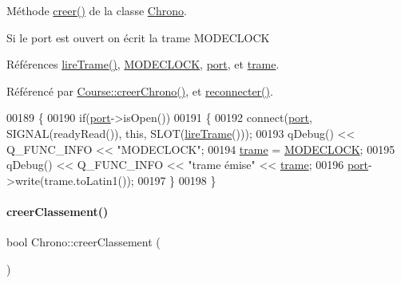 Méthode \hyperlink{class_chrono_a74d85a4e856e2e59afacaa061feb7b75}{creer()} de la classe \hyperlink{class_chrono}{Chrono}. 

Si le port est ouvert on écrit la trame M\+O\+D\+E\+C\+L\+O\+CK 

Références \hyperlink{class_chrono_ae7c3c8494ace02f4c9dd714f6f0e574a}{lire\+Trame()}, \hyperlink{chrono_8h_a51714542fe5fc5c442f126a96c568050}{M\+O\+D\+E\+C\+L\+O\+CK}, \hyperlink{class_chrono_aca5fbe0eebd7f876f954d4a99c564167}{port}, et \hyperlink{class_chrono_a26f2155aa6e5ef4296e5456b64a713b5}{trame}.



Référencé par \hyperlink{class_course_a6eb96222d8dc1f352e28f36e9b414448}{Course\+::creer\+Chrono()}, et \hyperlink{class_chrono_a80305a5dae33e8cd99604e809589564b}{reconnecter()}.


\begin{DoxyCode}
00189 \{
00190     \textcolor{keywordflow}{if}(\hyperlink{class_chrono_aca5fbe0eebd7f876f954d4a99c564167}{port}->isOpen())
00191     \{
00192         connect(\hyperlink{class_chrono_aca5fbe0eebd7f876f954d4a99c564167}{port}, SIGNAL(readyRead()), \textcolor{keyword}{this}, SLOT(\hyperlink{class_chrono_ae7c3c8494ace02f4c9dd714f6f0e574a}{lireTrame}()));
00193         qDebug() << Q\_FUNC\_INFO << \textcolor{stringliteral}{"MODECLOCK"};
00194         \hyperlink{class_chrono_a26f2155aa6e5ef4296e5456b64a713b5}{trame} = \hyperlink{chrono_8h_a51714542fe5fc5c442f126a96c568050}{MODECLOCK};
00195         qDebug() << Q\_FUNC\_INFO << \textcolor{stringliteral}{"trame émise"} << \hyperlink{class_chrono_a26f2155aa6e5ef4296e5456b64a713b5}{trame};
00196         \hyperlink{class_chrono_aca5fbe0eebd7f876f954d4a99c564167}{port}->write(trame.toLatin1());
00197     \}
00198 \}
\end{DoxyCode}
\mbox{\label{class_chrono_a0d7e3e50fcef0f2b0b7bfadc3d4f737d}} 
\paragraph{\texorpdfstring{creer\+Classement()}{creerClassement()}}
{\footnotesize\ttfamily bool Chrono\+::creer\+Classement (\begin{DoxyParamCaption}{ }\end{DoxyParamCaption})}



